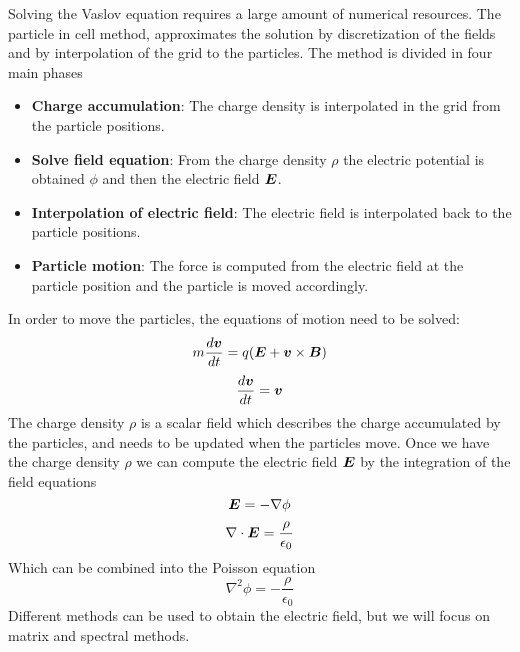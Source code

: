 Solving the Vaslov equation requires a large amount of numerical resources. The 
particle in cell method, approximates the solution by discretization of the 
fields and by interpolation of the grid to the particles. The method is divided 
in four main phases
%
\begin{itemize}
\item \textbf{Charge accumulation}: The charge density is interpolated in the 
grid from the particle positions.
\item \textbf{Solve field equation}: From the charge density $\rho$ the electric 
potential is obtained $\phi$ and then the electric field $\bm{E}$.
\item \textbf{Interpolation of electric field}: The electric field is  
interpolated back to the particle positions.
\item \textbf{Particle motion}: The force is computed from the electric field at 
the particle position and the particle is moved accordingly.
\end{itemize}
%


%
%
%
%
%


In order to move the particles, the equations of motion need to be solved:
%
\begin{equation}
m \frac{d\bm{v}}{dt} = q (\bm{E} + \bm{v} \times \bm{B})
\end{equation}
\begin{equation}
\frac{d\bm{v}}{dt}=\bm{v}
\end{equation}
%
The charge density $\rho$ is a scalar field which describes the charge 
accumulated by the particles, and needs to be updated when the particles move.
%
Once we have the charge density $\rho$ we can compute the electric field $\bm{E}$ by 
the integration of the field equations
%
\begin{equation}
\bm{E} = -\nabla \phi
\end{equation}
\begin{equation}
\nabla \cdot \bm{E} = \frac{\rho}{\epsilon_0}
\end{equation}
%
Which can be combined into the Poisson equation
%
\begin{equation}
\label{eq:poisson}
\nabla^2\phi = - \frac{\rho}{\epsilon_0}
\end{equation}
%
Different methods can be used to obtain the electric field, but we will focus on 
matrix and spectral methods.
